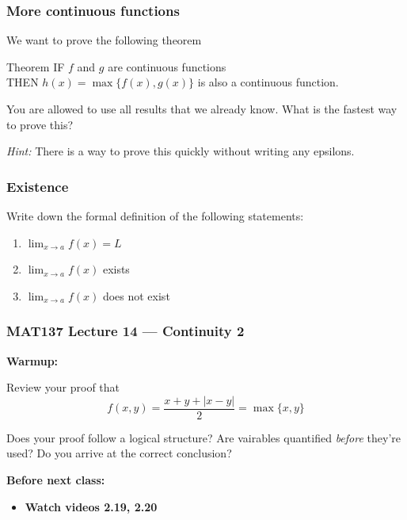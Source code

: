 \documentclass[14pt]{beamer}
\newcommand {\DS} [1] {${\displaystyle #1}$}
\begin{document}
\begin{frame}
\frametitle{More continuous functions}

We want to prove the following theorem
\begin{block}{Theorem}
IF $f$ and $g$ are continuous functions \\
THEN $h(x) = \max \{ f(x), g(x) \}$ is also a continuous function.
\end{block}

You are allowed to use all results that we already know.  What is the fastest way to prove this?


\vfill


\emph{Hint:}  
There is a way to prove this quickly without writing any epsilons.

\vfill

\end{frame}

\begin{frame}
\frametitle{Existence}

Write down the formal definition of the following statements:

\vfill
\begin{enumerate}

\item  \DS{\lim_{x \to a} f(x) = L}
\vfill

\item  \DS{\lim_{x \to a} f(x) } exists

\vfill
\item  \DS{\lim_{x \to a} f(x) } does not exist

\end{enumerate}

\vfill

\end{frame}


\begin{frame}
\frametitle{MAT137 Lecture 14 --- Continuity 2}
	{\bf Warmup:}

	Review your proof that
	\[
		f(x,y) = \frac{x+y+|x-y|}{2} = \max\{x,y\}
	\]
	
	Does your proof follow a logical structure? Are vairables quantified \emph{before} they're
	used? Do you arrive at the correct conclusion?


	\vfill
	{\bf Before next class:}
		\begin{itemize} \normalsize
			\item {\bf Watch videos 2.19, 2.20 }
		\end{itemize}
	\vfill

\end{frame}
\end{document}
